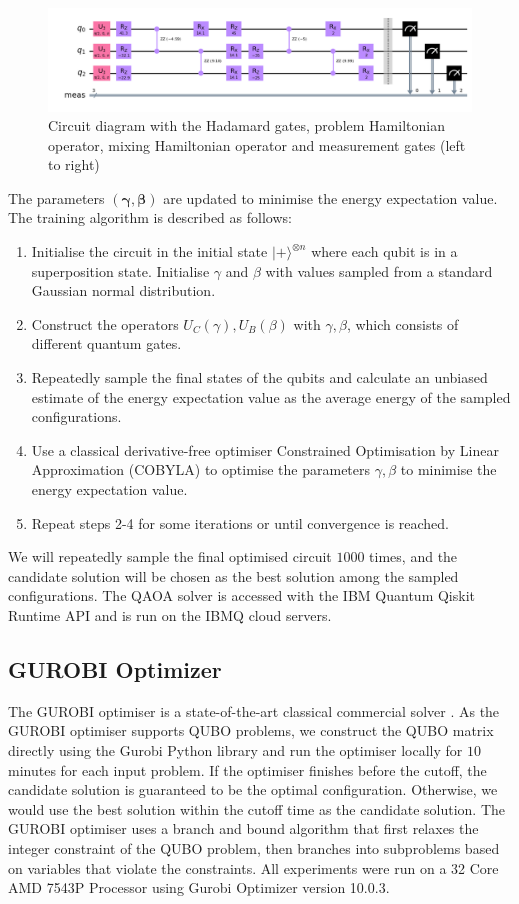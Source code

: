 \begin{figure}[htp]
    \centering
    \includegraphics[width=1\linewidth]{images/qiskit_circuit.png}
    \caption{Circuit diagram with the Hadamard gates, problem Hamiltonian operator, mixing Hamiltonian operator and measurement gates (left to right)}
    \label{qiskitcircuit}
\end{figure}

The parameters $(\boldsymbol{\gamma}, \boldsymbol{\beta})$ are updated to minimise the energy expectation value. The training algorithm is described as follows:
\begin{enumerate}
    \item Initialise the circuit in the initial state $| + \rangle^{\otimes n}$ where each qubit is in a superposition state. Initialise $\gamma$ and $\beta$ with values sampled from a standard Gaussian normal distribution. 
    \item Construct the operators $U_C(\gamma), U_B(\beta)$ with $\gamma, \beta$, which consists of different quantum gates.
    \item Repeatedly sample the final states of the qubits and calculate an unbiased estimate of the energy expectation value as the average energy of the sampled configurations.
    \item Use a classical derivative-free optimiser Constrained Optimisation by Linear Approximation (COBYLA) to optimise the parameters $\gamma, \beta$ to minimise the energy expectation value.
    \item Repeat steps 2-4 for some iterations or until convergence is reached.
\end{enumerate}
We will repeatedly sample the final optimised circuit $1000$ times, and the candidate solution will be chosen as the best solution among the sampled configurations. The QAOA solver is accessed with the IBM Quantum Qiskit Runtime API and is run on the IBMQ cloud servers.

\subsection{GUROBI Optimizer}
The GUROBI optimiser is a state-of-the-art classical commercial solver \cite{b26}. As the GUROBI optimiser supports QUBO problems, we construct the QUBO matrix directly using the Gurobi Python library and run the optimiser locally for $10$ minutes for each input problem. If the optimiser finishes before the cutoff, the candidate solution is guaranteed to be the optimal configuration. Otherwise, we would use the best solution within the cutoff time as the candidate solution. The GUROBI optimiser uses a branch and bound algorithm that first relaxes the integer constraint of the QUBO problem, then branches into subproblems based on variables that violate the constraints. All experiments were run on a 32 Core AMD 7543P Processor using Gurobi Optimizer version 10.0.3.

